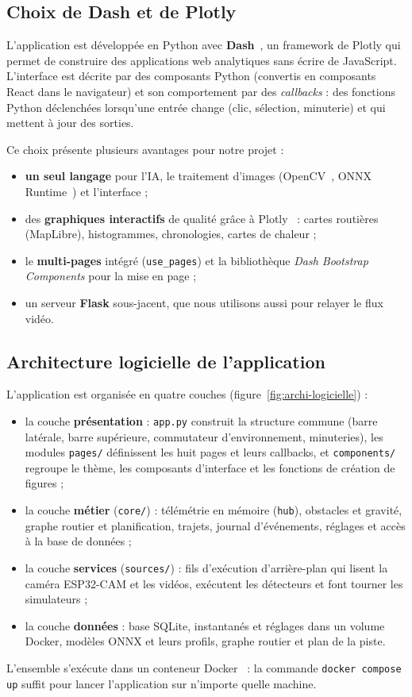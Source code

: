 \subsection{Choix de Dash et de Plotly}
L'application est développée en Python avec \textbf{Dash}~\cite{dash}, un framework de Plotly qui permet de construire
des applications web analytiques sans écrire de JavaScript. L'interface est décrite par des composants Python
(convertis en composants React dans le navigateur) et son comportement par des \emph{callbacks} : des fonctions
Python déclenchées lorsqu'une entrée change (clic, sélection, minuterie) et qui mettent à jour des sorties.

Ce choix présente plusieurs avantages pour notre projet :
\begin{itemize}
  \item \textbf{un seul langage} pour l'IA, le traitement d'images (OpenCV~\cite{opencv}, ONNX
        Runtime~\cite{onnxruntime}) et l'interface ;
  \item des \textbf{graphiques interactifs} de qualité grâce à Plotly~\cite{plotly} : cartes routières (MapLibre),
        histogrammes, chronologies, cartes de chaleur ;
  \item le \textbf{multi-pages} intégré (\texttt{use\_pages}) et la bibliothèque \textit{Dash Bootstrap Components}
        pour la mise en page ;
  \item un serveur \textbf{Flask} sous-jacent, que nous utilisons aussi pour relayer le flux vidéo.
\end{itemize}

\subsection{Architecture logicielle de l'application}
L'application est organisée en quatre couches (figure~\ref{fig:archi-logicielle}) :
\begin{itemize}
  \item la couche \textbf{présentation} : \texttt{app.py} construit la structure commune (barre latérale, barre
        supérieure, commutateur d'environnement, minuteries), les modules \texttt{pages/} définissent les huit pages
        et leurs callbacks, et \texttt{components/} regroupe le thème, les composants d'interface et les fonctions
        de création de figures ;
  \item la couche \textbf{métier} (\texttt{core/}) : télémétrie en mémoire (\texttt{hub}), obstacles et gravité,
        graphe routier et planification, trajets, journal d'événements, réglages et accès à la base de données ;
  \item la couche \textbf{services} (\texttt{sources/}) : fils d'exécution d'arrière-plan qui lisent la caméra
        ESP32-CAM et les vidéos, exécutent les détecteurs et font tourner les simulateurs ;
  \item la couche \textbf{données} : base SQLite, instantanés et réglages dans un volume Docker, modèles ONNX et
        leurs profils, graphe routier et plan de la piste.
\end{itemize}
L'ensemble s'exécute dans un conteneur Docker~\cite{docker} : la commande \texttt{docker compose up} suffit pour
lancer l'application sur n'importe quelle machine.

